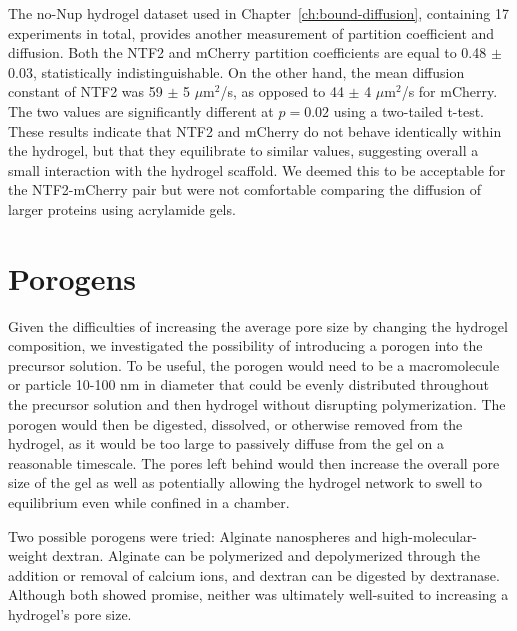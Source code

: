 The no-Nup hydrogel dataset used in Chapter~\ref{ch:bound-diffusion}, containing 17 experiments in total, provides another measurement of partition coefficient and diffusion.  Both the NTF2 and mCherry partition coefficients are equal to 0.48 $\pm$ 0.03, statistically indistinguishable.  On the other hand, the mean diffusion constant of NTF2 was 59 $\pm$ 5 $\mu$m$^2$/s, as opposed to 44 $\pm$ 4 $\mu$m$^2$/s for mCherry.  The two values are significantly different at $p=0.02$ using a two-tailed t-test.  These results indicate that NTF2 and mCherry do not behave identically within the hydrogel, but that they equilibrate to similar values, suggesting overall a small interaction with the hydrogel scaffold.  We deemed this to be acceptable for the NTF2-mCherry pair but were not comfortable comparing the diffusion of larger proteins using acrylamide gels.
%
%

\section{Porogens}

Given the difficulties of increasing the average pore size by changing the hydrogel composition, we investigated the possibility of introducing a porogen into the precursor solution.  To be useful, the porogen would need to be a macromolecule or particle 10-100 nm in diameter that could be evenly distributed throughout the precursor solution and then hydrogel without disrupting polymerization.  The porogen would then be digested, dissolved, or otherwise removed from the hydrogel, as it would be too large to passively diffuse from the gel on a reasonable timescale.  The pores left behind would then increase the overall pore size of the gel as well as potentially allowing the hydrogel network to swell to equilibrium even while confined in a chamber.

Two possible porogens were tried: Alginate nanospheres and high-molecular-weight dextran.  Alginate can be polymerized and depolymerized through the addition or removal of calcium ions, and dextran can be digested by dextranase.  Although both showed promise, neither was ultimately well-suited to increasing a hydrogel's pore size.

